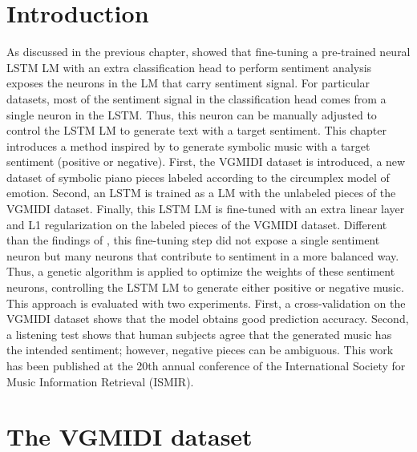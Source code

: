 \section{Introduction}

As discussed in the previous chapter, \citet{radford_2017} showed that fine-tuning a pre-trained neural LSTM LM with an extra classification head to perform sentiment analysis exposes the neurons in the LM that carry sentiment signal. For particular datasets, most of the sentiment signal in the classification head comes from a single neuron in the LSTM. Thus, this neuron can be manually adjusted to control the LSTM LM to generate text with a target sentiment. This chapter introduces a method inspired by \citet{radford_2017} to generate symbolic music with a target sentiment (positive or negative). First, the VGMIDI dataset is introduced, a new dataset of symbolic piano pieces labeled according to the circumplex model of emotion. Second, an LSTM is trained as a LM with the unlabeled pieces of the VGMIDI dataset. Finally, this LSTM LM is fine-tuned with an extra linear layer and L1 regularization on the labeled pieces of the VGMIDI dataset. Different than the findings of \citet{radford_2017}, this fine-tuning step did not expose a single sentiment neuron but many neurons that contribute to sentiment in a more balanced way. Thus, a genetic algorithm is applied to optimize the weights of these sentiment neurons, controlling the LSTM LM to generate either positive or negative music. This approach is evaluated with two experiments. First, a cross-validation on the VGMIDI dataset shows that the model obtains good prediction accuracy. Second, a listening test shows that human subjects agree that the generated music has the intended sentiment; however, negative pieces can be ambiguous. This work has been published at the 20th annual conference of the International Society for Music Information Retrieval (ISMIR).

\section{The VGMIDI dataset}

